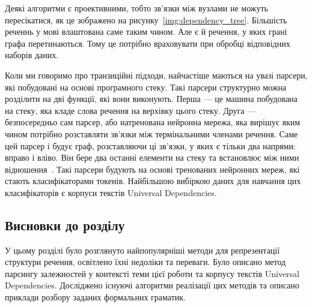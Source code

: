 Деякі алгоритми є проективними, тобто зв'язки між вузлами не можуть пересікатися, як
це зображено на рисунку~\ref{img:dependency_tree}. Більшість реченнь у мові
влаштована саме таким чином. Але є й речення, у яких грані графа перетинаються. Тому це
потрібно враховувати при обробці відповідних наборів даних.

Коли ми говоримо про транзиційні підходи, найчастіше маються на увазі
парсери, які побудовані на основі програмного стеку. Такі парсери структурно можна
розділити на дві функції, які вони виконують. Перша --- це машина побудована на стеку,
яка кладе слова речення на верхівку цього стеку. Друга --- безпосередньо
сам парсер, або натренована нейронна мережа, яка вирішує яким чином потрібно
розставляти зв'язки між термінальними членами речення. Саме цей парсер і будує
граф, розставляючи ці зв'язки, у яких є тільки два напрями: вправо і вліво.
Він бере два останні елементи на стеку та встановлює між ними відношення~\cite{bib8}.
Такі парсери будують на основі тренованих нейронних мереж, які
стають класифікаторами токенів. Найбільшою вибіркою даних для навчання цих класифікаторів
є корпуси текстів Universal Dependencies.


\subsection*{Висновки до розділу }
У цьому розділі було розглянуто найпопулярніші методи для репрезентації структури речення, освітлено їхні недоліки та переваги. Було описано метод парсингу залежностей у контексті теми цієї роботи та корпусу текстів Universal
Dependencies. Досліджено існуючі алгоритми реалізації цих методів та описано
приклади розбору заданих формальних граматик.